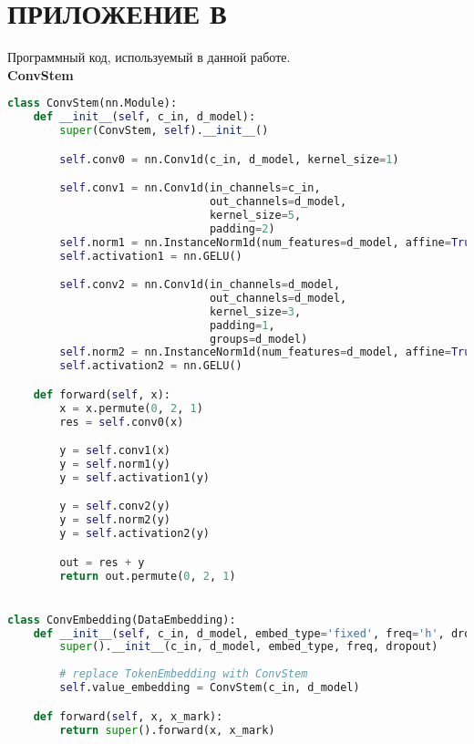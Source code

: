 \section*{ПРИЛОЖЕНИЕ В}



Программный код, используемый в данной работе.\\

{\noindent\hspace{-12.5pt}\normalsize\bfseries ConvStem}\vspace{-10pt}
\begin{center}
  \begin{lstlisting}[language=Python, 
  label={lst:convstem}]
class ConvStem(nn.Module):
    def __init__(self, c_in, d_model):
        super(ConvStem, self).__init__()

        self.conv0 = nn.Conv1d(c_in, d_model, kernel_size=1)

        self.conv1 = nn.Conv1d(in_channels=c_in,
                               out_channels=d_model,
                               kernel_size=5,
                               padding=2)
        self.norm1 = nn.InstanceNorm1d(num_features=d_model, affine=True)
        self.activation1 = nn.GELU()

        self.conv2 = nn.Conv1d(in_channels=d_model,
                               out_channels=d_model,
                               kernel_size=3,
                               padding=1,
                               groups=d_model)
        self.norm2 = nn.InstanceNorm1d(num_features=d_model, affine=True)
        self.activation2 = nn.GELU()

    def forward(self, x):
        x = x.permute(0, 2, 1) 
        res = self.conv0(x)

        y = self.conv1(x)
        y = self.norm1(y)
        y = self.activation1(y)

        y = self.conv2(y)
        y = self.norm2(y)
        y = self.activation2(y)

        out = res + y
        return out.permute(0, 2, 1)


class ConvEmbedding(DataEmbedding):
    def __init__(self, c_in, d_model, embed_type='fixed', freq='h', dropout=0.1):
        super().__init__(c_in, d_model, embed_type, freq, dropout)
        
        # replace TokenEmbedding with ConvStem
        self.value_embedding = ConvStem(c_in, d_model)

    def forward(self, x, x_mark):
        return super().forward(x, x_mark)
  \end{lstlisting}
\end{center}

